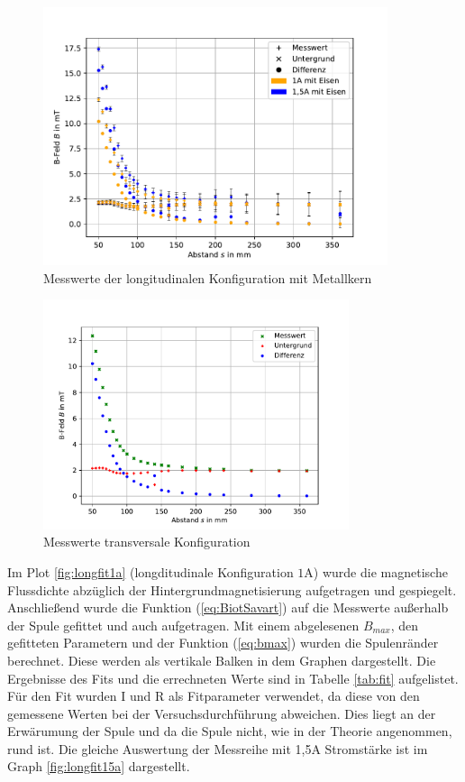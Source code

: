 \documentclass[11pt, a4paper]{article}
\begin{document}
    \begin{figure}[h]
        \centering
        \includegraphics[width=0.9\textwidth]{mitKernRaw.pdf}
        \caption{Messwerte der longitudinalen Konfiguration mit Metallkern}
        \label{fig:longmessmitKern}
    \end{figure}
    \begin{figure}[h]
        \centering
        \includegraphics[width=0.8\textwidth]{raw2.pdf}
        \caption{Messwerte transversale Konfiguration}
        \label{fig:transmess}
    \end{figure}



    Im Plot \ref{fig:longfit1a} (longditudinale Konfiguration $1 \si{\ampere}$) wurde die magnetische Flussdichte abzüglich der Hintergrundmagnetisierung aufgetragen und gespiegelt. Anschließend wurde die Funktion (\ref{eq:BiotSavart}) auf die Messwerte außerhalb der Spule gefittet und auch aufgetragen. Mit einem abgelesenen $B_{max}$,  den gefitteten Parametern und der Funktion (\ref{eq:bmax}) wurden die Spulenränder berechnet. Diese werden als vertikale Balken in dem Graphen dargestellt. 
    Die Ergebnisse des Fits und die errechneten Werte sind in Tabelle \ref{tab:fit} aufgelistet. Für den Fit wurden I und R als Fitparameter verwendet, da diese von den gemessene Werten bei der Versuchsdurchführung abweichen. Dies liegt an der Erwärumung der Spule und da die Spule nicht, wie in der Theorie angenommen, rund ist.
    Die gleiche Auswertung der Messreihe mit 1,5A Stromstärke ist im Graph \ref{fig:longfit15a} dargestellt.
    
\end{document}
